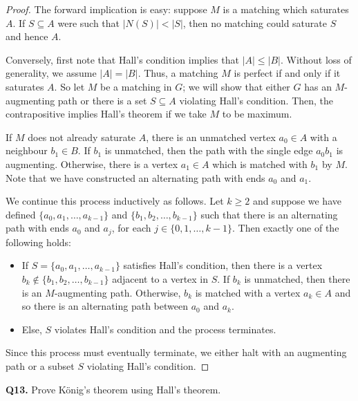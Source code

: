 \begin{proof}
The forward implication is easy: suppose \( M \) is a matching which saturates \( A \). If \( S \subseteq A \)  were such that \( |N(S)| < |S| \), then no matching could saturate \( S \) and hence \( A \).

Conversely, first note that Hall's condition implies that \( |A| \leq |B|\). Without loss of generality, we assume \( |A| = |B| \). Thus, a matching \( M \) is perfect if and only if it saturates \( A \). So let \( M \) be a matching in \( G \); we will show that either \( G \) has an \( M \)-augmenting path or there is a set \( S \subseteq A \) violating Hall's condition. Then, the contrapositive implies Hall's theorem if we take \( M \) to be maximum.

If \( M \) does not already saturate \( A \), there is an unmatched vertex \( a_0 \in A \) with a neighbour \( b_1 \in B \). If \( b_1 \) is unmatched, then the path with the single edge \( a_0b_1 \) is augmenting. Otherwise, there is a vertex \( a_1 \in A \) which is matched with \( b_1 \) by \( M \). Note that we have constructed an alternating path with ends \( a_0 \) and \( a_1 \). 

We continue this process inductively as follows. Let \( k \geq 2 \) and suppose we have defined \( \{ a_0, a_1, \hdots , a_{k - 1}  \}  \) and \( \{ b_1, b_2, \hdots , b_{k - 1}  \}  \) such that there is an alternating path with ends \( a_0 \) and \( a_{j}  \), for each \( j \in \{ 0, 1, \hdots ,k-1 \}  \). Then exactly one of the following holds:
\begin{itemize}[nolistsep]
	\item If \( S = \{ a_0, a_1, \hdots , a_{k-1}  \}  \) satisfies Hall's condition, then there is a vertex \( b_{k} \notin \{ b_1, b_2, \hdots ,b_{k-1}  \}   \) adjacent to a vertex in \( S \). If \( b_{k}  \) is unmatched, then there is an \( M \)-augmenting path. Otherwise, \( b_{k}  \) is matched with a vertex \( a_{k} \in A \) and so there is an alternating path between \( a_0 \) and \( a_{k}  \).
	\item Else, \( S \) violates Hall's condition and the process terminates.
\end{itemize}
Since this process must eventually terminate, we either halt with an augmenting path or a subset \( S \) violating Hall's condition.
\end{proof}
\noindent \textbf{Q13.} Prove K\"onig's theorem using Hall's theorem.
